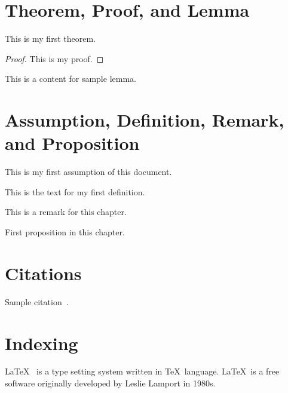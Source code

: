 \section{Theorem, Proof, and Lemma}
\label{sec:theorem}
\begin{theorem}
  \label{thm:th1}
  This is my first theorem.
\end{theorem}
\begin{proof}
  This is my proof.
\end{proof}
\begin{lemma}
  This is a content for sample lemma. 
\end{lemma}

\section{Assumption, Definition, Remark, and Proposition}
\label{sec:assum}

\begin{assumption}
\label{asm:as1}
This is my first assumption of this document.
\end{assumption}

\begin{definition}
\label{def:def1}
This is the text for my first definition.
\end{definition}

\begin{remark}
\label{rem:rem1}
This is a remark for this chapter.
\end{remark}

\begin{proposition}
\label{prp:prop1}
First proposition in this chapter.
\end{proposition}

\section{Citations}\label{sec:citations}
Sample citation~\cite{lamport1994latex}.

\section{Indexing}\label{sec:indexing} \LaTeX\  is a 
type setting system written in \TeX\ language. \LaTeX\ 
is a free software originally developed by 
Leslie Lamport in 1980s. 



